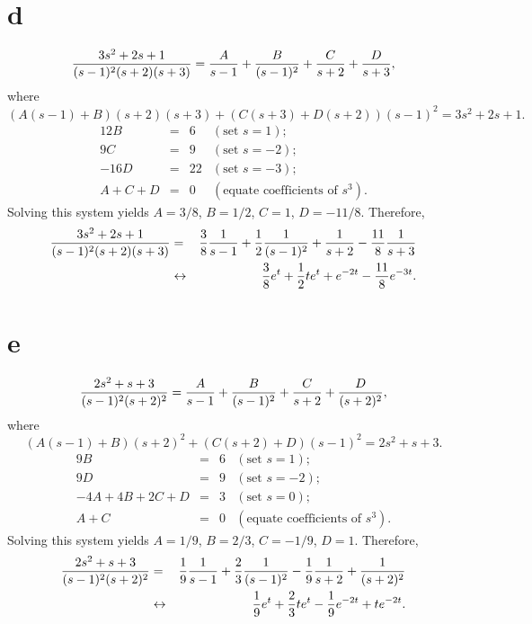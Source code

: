 \documentclass[dvips]{book}
\numberwithin{example}{section}
\numberwithin{equation}{section}
\numberwithin{theorem}{section}
\numberwithin{table}{section}
\numberwithin{figure}{section}
\begin{document}
\part{d}
$$
{3s^2+2s+1\over(s-1)^2(s+2)(s+3)}=
{A\over s-1}+{B\over(s-1)^2}+{C\over s+2}+{D\over s+3},
$$
where
$$
(A(s-1)+B)(s+2)(s+3)+(C(s+3)+D(s+2))(s-1)^2=3s^2+2s+1.
$$
$$
\begin{array}{rcrl}
12B&=&6&(\mbox{set }s=1);\\
9C&=&9& (\mbox{set }s=-2);\\
-16D&=&22&(\mbox{set }s=-3);\\
A+C+D&=&0&(\mbox{equate coefficients of }s^3).
\end{array}
$$
Solving this system yields
$A=3/8$, $B=1/2$, $C=1$, $D=-11/8$.
Therefore,
\begin{eqnarray*}
{3s^2+2s+1\over(s-1)^2(s+2)(s+3)}&=&
{3\over8}{1\over s-1}+{1\over2}{1\over(s-1)^2}+{1\over
s+2}-{11\over8}{1\over s+3}\\
&\leftrightarrow&
{3\over8}e^t+{1\over2}te^t+e^{-2t}-{11\over8}e^{-3t}.
\end{eqnarray*}

\part{e}
$$
{2s^2+s+3\over(s-1)^2(s+2)^2}=
{A\over s-1}+{B\over(s-1)^2}+{C\over s+2}+{D\over(s+2)^2},
$$
where
$$
(A(s-1)+B)(s+2)^2+(C(s+2)+D)(s-1)^2=2s^2+s+3.
$$
$$
\begin{array}{rcrl}
9B&=&6&(\mbox{set }s=1);\\
9D&=&9& (\mbox{set }s=-2);\\
-4A+4B+2C+D&=&3&(\mbox{set }s=0);\\
A+C&=&0&(\mbox{equate coefficients of }s^3).
\end{array}
$$
Solving this system yields
$A=1/9$, $B=2/3$, $C=-1/9$, $D=1$.
Therefore,
\begin{eqnarray*}
{2s^2+s+3\over(s-1)^2(s+2)^2}&=&
{1\over9}{1\over s-1}+{2\over3}{1\over(s-1)^2}-{1\over9}{1\over
s+2}+{1\over(s+2)^2}\\
&\leftrightarrow&
{1\over9}e^t+{2\over3}te^t-{1\over9}e^{-2t}+te^{-2t}.
\end{eqnarray*}
\end{document}

